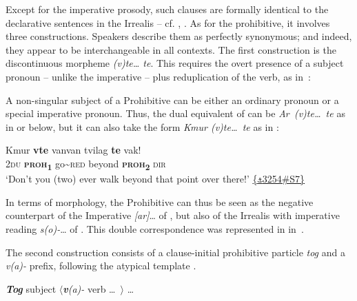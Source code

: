 \documentclass[output=paper,colorlinks,citecolor=brown,draft]{langscibook}
\begin{document}
\noindent Except for the imperative prosody, such clauses are formally identical to the declarative sentences in the Irrealis – cf. , . As for the prohibitive, it involves three constructions. Speakers describe them as perfectly synonymous; and indeed, they appear to be interchangeable in all contexts. The first construction is the discontinuous morpheme \textit{(v)te… te}. This requires the overt presence of a subject pronoun – unlike the imperative  – plus reduplication of the verb, as in~:


A non-singular subject of a Prohibitive can be either an ordinary pronoun or a special imperative pronoun. Thus, the dual equivalent of  can be \textit{Ar~(v)te…~te} as in  or  below, but it can also take the form \textit{Kmur (v)te…~te} as in :

\ea\label{ex:dor:tvilag}
    \gll  Kmur \textbf{vte} vanvan tvilag \textbf{te} vak!\\ 
          \textsc{2du} \textbf{\textsc{proh}\textsubscript{1}} go{\textasciitilde}\textsc{red} beyond \textbf{\textsc{proh}\textsubscript{2}} \textsc{dir}\\
    \glt ‘Don’t you (two) ever walk beyond that point over there!’ \quad \href{https://doi.org/10.24397/pangloss-0003254#S7}{\{\texttt{⚓}3254\#S7\}}
\z 

\noindent In terms of morphology, the Prohibitive can thus be seen as the negative counterpart of the Imperative \textit{[ar]}… of , but also of the Irrealis with imperative reading \textit{s(o)-}… of . This double correspondence was represented in  in~.

The second construction consists of a clause-initial prohibitive particle \textit{tog} and a \textit{v(a)-} prefix, following the atypical template .

\ea\label{ex:dor:tog subject}
\textbf{\textit{Tog}} subject \textrm{${\langle}$}\textbf{\textit{v}}\textit{(a)-} verb …~\textrm{${\rangle}$} …
\z 
\end{document}
